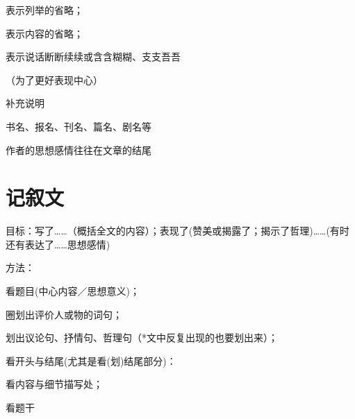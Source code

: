 \begin{asparaenum}[(1)]
\item 表示列举的省略；
\item 表示内容的省略；
\item 表示说话断断续续或含含糊糊、支支吾吾
\item （为了更好表现中心）
\end{asparaenum}

补充说明

书名、报名、刊名、篇名、剧名等

作者的思想感情往往在文章的结尾







\section{记叙文}

目标：写了\ldots{}\ldots{}（概括全文的内容）；表现了(赞美或揭露了；揭示了哲理)\ldots{}\ldots{}(有时还有表达了\ldots{}\ldots{}思想感情)\par
方法：\begin{asparaenum}[(1)]\item 看题目(中心内容／思想意义)；
        \item 圈划出评价人或物的词句；
        \item 划出议论句、抒情句、哲理句（*文中反复出现的也要划出来）；
        \item 看开头与结尾(尤其是看(划)结尾部分)：
        \item 看内容与细节描写处；
        \item 看题干
\end{asparaenum}

